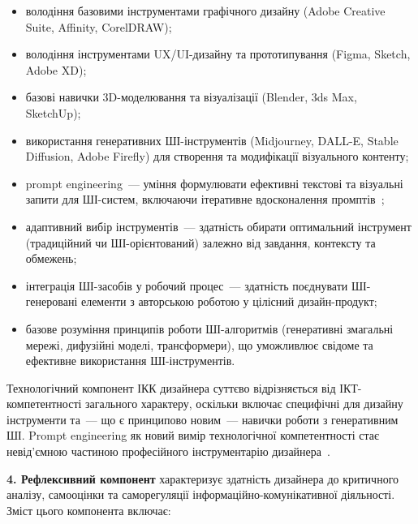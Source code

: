 \begin{itemize}
    \item володіння базовими інструментами графічного дизайну (Adobe Creative Suite, Affinity, CorelDRAW);
    \item володіння інструментами UX/UI-дизайну та прототипування (Figma, Sketch, Adobe XD);
    \item базові навички 3D-моделювання та візуалізації (Blender, 3ds Max, SketchUp);
    \item використання генеративних ШІ-інструментів (Midjourney, DALL-E, Stable Diffusion, Adobe Firefly) для створення та модифікації візуального контенту;
    \item prompt engineering~--- уміння формулювати ефективні текстові та візуальні запити для ШІ-систем, включаючи ітеративне вдосконалення промптів~\cite{Musiienko2026ScopingReview};
    \item адаптивний вибір інструментів~--- здатність обирати оптимальний інструмент (традиційний чи ШІ-орієнтований) залежно від завдання, контексту та обмежень;
    \item інтеграція ШІ-засобів у робочий процес~--- здатність поєднувати ШІ-генеровані елементи з авторською роботою у цілісний дизайн-продукт;
    \item базове розуміння принципів роботи ШІ-алгоритмів (генеративні змагальні мережі, дифузійні моделі, трансформери), що уможливлює свідоме та ефективне використання ШІ-інструментів.
\end{itemize}

Технологічний компонент ІКК дизайнера суттєво відрізняється від ІКТ-компетентності загального характеру, оскільки включає специфічні для дизайну інструменти та~--- що є принципово новим~--- навички роботи з генеративним ШІ. Prompt engineering як новий вимір технологічної компетентності стає невід'ємною частиною професійного інструментарію дизайнера~\cite{Musiienko2026ScopingReview}.

\textbf{4. Рефлексивний компонент} характеризує здатність дизайнера до критичного аналізу, самооцінки та саморегуляції інформаційно-комунікативної діяльності. Зміст цього компонента включає:

